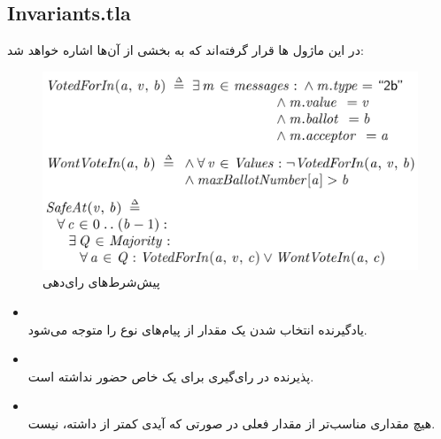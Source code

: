 \documentclass{article}
\begin{document}
\begin{multicols}{2}
\subsection*{Invariants.tla}
در این ماژول
ها قرار گرفته‌اند که به بخشی از آن‌ها اشاره خواهد شد:
\begin{figure}[H]
    \centering
    \includegraphics[width=0.99\linewidth]{Photos/HW6/voted.png}
    \caption{
    پیش‌شرط‌های رای‌دهی
    }
    \label{fig:my_label}
\end{figure}
\begin{itemize}
    \item {}\\
    یادگیرنده انتخاب شدن یک مقدار از پیام‌های نوع
    را متوجه می‌شود.
    \item {}\\
    پذیرنده در رای‌گیری برای یک
    خاص حضور نداشته است.
    \item {}\\
    هیچ مقداری مناسب‌تر از مقدار فعلی در صورتی که آیدی کمتر از
    داشته، نیست.
\end{itemize}

\end{multicols}
\end{document}
